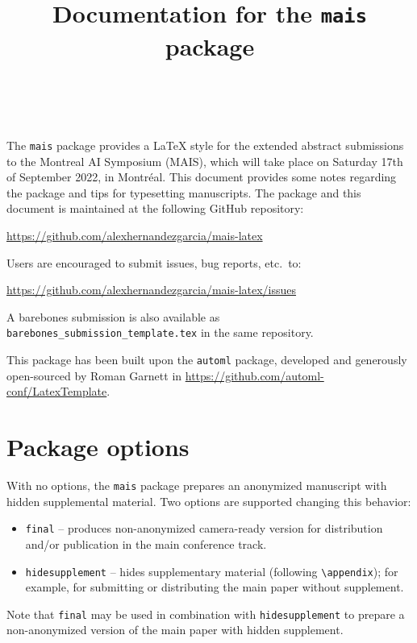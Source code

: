 \documentclass[11pt]{article}
\title{Documentation for the \texttt{mais} package}
\author[1]{\nameemail{Author 1}{email1@example.com}}
\author[2,3]{\nameemail{Author 2}{email2@example.com}}
\author[3]{\nameemail{Author 3}{email3@example.com}}
\author[4]{\nameemail{Author 4}{email4@example.com}}
\author[3]{\\\nameemail{Author 5}{email5@example.com}}
\affil[1]{Institution 1}
\affil[2]{Institution 2}
\affil[3]{Institution 3}
\affil[4]{Institution 4}
\begin{document}
\maketitle

The \texttt{mais} package provides a \LaTeX{} style for the extended abstract submissions to the Montreal AI Symposium (MAIS), which will take place on Saturday 17th of September 2022, in Montréal. This document provides some notes regarding the package and tips for typesetting manuscripts. The package and this document is maintained at the following GitHub
repository:

\begin{center}
  \url{https://github.com/alexhernandezgarcia/mais-latex}
\end{center}

Users are encouraged to submit issues, bug reports, etc.\ to:

\begin{center}
  \url{https://github.com/alexhernandezgarcia/mais-latex/issues}
\end{center}

A barebones submission is also available as \texttt{barebones\_submission\_template.tex} in the same repository.

This package has been built upon the \texttt{automl} package, developed and generously open-sourced by Roman Garnett in \url{https://github.com/automl-conf/LatexTemplate}.

\section{Package options}

With no options, the \texttt{mais} package prepares an anonymized manuscript with hidden supplemental material. Two options are supported changing this behavior:

\begin{itemize}
\item \texttt{final} -- produces non-anonymized camera-ready version for distribution and/or publication in the main conference track.
\item \texttt{hidesupplement} -- hides supplementary material (following \verb|\appendix|); for example, for submitting or distributing the main paper without supplement.
\end{itemize}

Note that \texttt{final} may be used in combination with \texttt{hidesupplement} to prepare a non-anonymized version of the main paper with hidden supplement.
\end{document}
